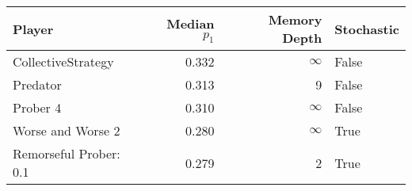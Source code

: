\begin{tabular}{lrrl}
\toprule
                 Player &  Median $p_1$ &  Memory Depth & Stochastic \\
\midrule
     CollectiveStrategy &         0.332 &            \(\infty\) &      False \\
               Predator &         0.313 &             9 &      False \\
               Prober 4 &         0.310 &            \(\infty\) &      False \\
      Worse and Worse 2 &         0.280 &            \(\infty\) &       True \\
 Remorseful Prober: 0.1 &         0.279 &             2 &       True \\
\bottomrule
\end{tabular}
